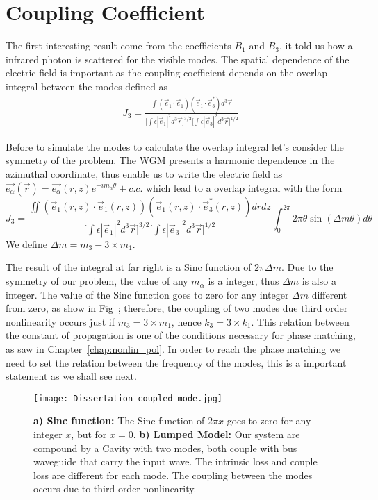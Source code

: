 \section{Coupling Coefficient}

The first interesting result come from the coefficients $B_1$ and $B_3$, it told us how a infrared photon is scattered for the visible modes. The spatial dependence of the electric field is important as the coupling coefficient depends on the overlap integral between the modes defined as 
\begin{eqnarray}
J_3 = \frac{\int
        (\vec{e}_1\cdot\vec{e}_1)(\vec{e}_1\cdot\vec{e}^*_3)
        d^3\vec{r}}{\Big[\int \epsilon|\vec{e}_1|^2 d^3\vec{r}\Big]^{3/2}\Big[\int \epsilon|\vec{e}_3|^2 d^3\vec{r}\Big]^{1/2}}
\end{eqnarray}

Before to simulate the modes to calculate the overlap integral let's consider the symmetry of the problem. The WGM presents a harmonic dependence in the azimuthal coordinate, thus enable us to write the electric field as $\vec{e_\alpha}(\vec{r}) = \vec{e_\alpha}(r,z)e^{-im_\alpha\theta}+c.c.$ which lead to a overlap integral with the form
\begin{equation}
    J_3 = \frac{\iint
        (\vec{e}_1(r,z)\cdot\vec{e}_1(r,z))(\vec{e}_1(r,z)\cdot\vec{e}^*_3(r,z))
        drdz}{\Big[\int \epsilon|\vec{e}_1|^2 d^3\vec{r}\Big]^{3/2}\Big[\int \epsilon|\vec{e}_3|^2 d^3\vec{r}\Big]^{1/2}} \int_0^{2\pi} 2\pi \theta \sin\left(\Delta m \theta\right)   d\theta
    \label{eq:overlap_j3}
\end{equation}
We define $\Delta m = m_3 -3\times m_1$. 

The result of the integral at far right is a Sinc function of $2\pi\Delta m$. Due to the symmetry of our problem, the value of any $m_\alpha$ is a integer, thus $\Delta m$ is also a integer. The value of the Sinc function goes to zero for any integer $\Delta m$ different from zero, as show in Fig~; therefore, the coupling of two modes due third order nonlinearity occurs just if $m_3 = 3\times m_1$, hence $k_3 = 3 \times k_1$. This relation between the constant of propagation is one of the conditions necessary for phase matching, as saw in Chapter~\ref{chap:nonlin_pol}. In order to reach the phase matching we need to set the relation between the frequency of the modes, this is a important statement as we shall see next.  

\begin{figure}[t]
    \centering
    \texttt{[image: Dissertation\_coupled\_mode.jpg]}
    \caption{\textbf{a) Sinc function:} The Sinc function of $2\pi x$ goes to zero for any integer $x$, but for $x=0$. \textbf{b) Lumped Model:} Our system are compound by a Cavity with two modes, both couple with bus waveguide that carry the input wave. The intrinsic loss and couple loss are different for each mode. The coupling between the modes occurs due to third order nonlinearity. }
    \label{fig:toy_model}
\end{figure}

